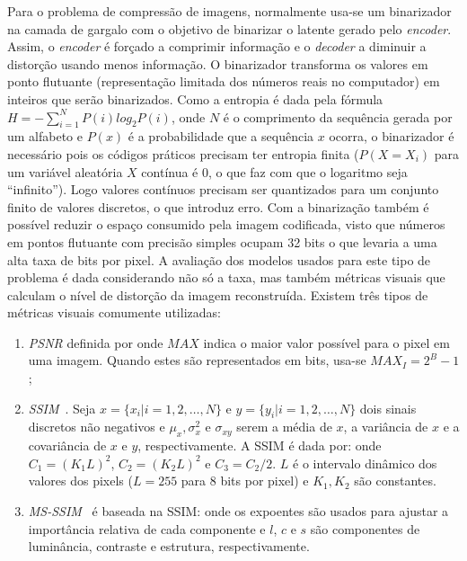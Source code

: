 Para o problema de compressão de imagens, normalmente usa-se um binarizador na camada de gargalo com o objetivo de binarizar o latente gerado pelo \textit{encoder}. Assim, o \textit{encoder} é forçado a comprimir informação e o \textit{decoder} a diminuir a distorção usando menos informação. O binarizador transforma os valores em ponto flutuante (representação limitada dos números reais no computador) em inteiros que serão binarizados.
Como a entropia é dada pela fórmula $H = -\sum_{i=1}^N P(i)log_2P(i)$, onde $N$ é o comprimento da sequência gerada por um alfabeto e $P(x)$ é a probabilidade que a sequência $x$ ocorra, o binarizador é necessário pois os códigos práticos precisam ter entropia finita ($P(X=X_i)$ para um variável aleatória $X$ contínua é 0, o que faz com que o logaritmo seja ``infinito''). Logo valores contínuos precisam ser quantizados para um conjunto finito de valores discretos, o que introduz erro. Com a binarização também é possível reduzir o espaço consumido pela imagem codificada, visto que números em pontos flutuante com precisão simples ocupam 32 bits o que levaria a uma alta taxa de bits por pixel. A avaliação dos modelos usados para este tipo de problema é dada considerando não só a taxa, mas também métricas visuais que calculam o nível de distorção da imagem reconstruída. Existem três tipos de métricas visuais comumente utilizadas:
\begin{enumerate}
    \item \textit{\acrshort{PSNR}} definida por  onde $MAX$ indica o maior valor possível para o pixel em uma imagem. Quando estes são representados em bits, usa-se $MAX_I = 2^B - 1$;
    \item \textit{\acrshort{SSIM}}~\cite{wang2004image}. Seja $x = \{x_i|i = 1,2,\dots,N\}$ e $y = \{y_i|i = 1,2,\dots,N\}$ dois sinais discretos não negativos e $\mu_x, \sigma_x^2$ e $\sigma_{xy}$ serem a média de $x$, a variância de $x$ e a covariância de $x$ e $y$, respectivamente. A \acrshort{SSIM} é dada por:
     onde $C_1 = {(K_1L)}^2$, $C_2 = {(K_2L)}^2$ e $C_3 = C_2/2$. $L$ é o intervalo dinâmico dos valores dos pixels ($L = 255$ para 8 bits por pixel) e $K_1, K_2$ são constantes.
    \item \textit{\acrshort{MS-SSIM}}~\cite{wang2003multiscale} é baseada na \acrshort{SSIM}: 
    \equacao{MSSSIM}{MSSSIM(x,y) = {[l_M(x,y)]}^{\alpha M} \cdot \prod_{j=1}^{M}{[c_j(x,y)}^{\beta_j}{[s_j(x,y)]}^{\gamma_j},} onde os expoentes são usados para ajustar a importância relativa de cada componente e $l$, $c$ e $s$ são componentes de luminância, contraste e estrutura, respectivamente.
\end{enumerate}
